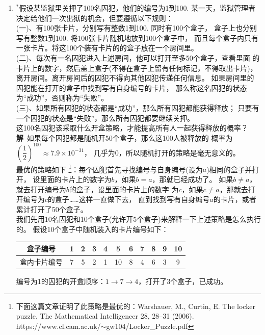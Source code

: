 \begin{enumerate}[label={【\textbf{例\thechapter.\arabic*}】},
 leftmargin=\inteval{\myenumleftmargin}pt,
 itemsep=\inteval{\myenumitempsep}pt,
 itemindent=\inteval{\myenumitemindent}pt]
\item $^*$假设某监狱里关押了100名囚犯，他们的编号为1到100. 
某一天，监狱管理者决定给他们一次出狱的机会，但要遵循以下规则：\\
(一)、有100张卡片，分别写有整数1到100. 同时有100个盒子，
盒子上也分别写有整数1到100. 将100张卡片随机地放到100个盒子中，
而且每个盒子内只有一张卡片。将这100个装有卡片的的盒子放在一个房间里。\\
(二)、每次有一名囚犯进入上述房间，他可以打开至多50个盒子，查看里面
的卡片上的数字，然后盖上盒子(不得在盒子上留有任何标记，不得取出卡片)，
离开房间。离开房间后的囚犯不得向其他囚犯传递任何信息。
如果房间里的囚犯能在打开的盒子中找到写有自身编号的卡片，
那么称这名囚犯的状态为“成功”，否则称为“失败”。\\
(三)、如果所有囚犯的状态都是“成功”，那么所有囚犯都能获得释放；
只要有一个囚犯的状态是“失败”，那么所有囚犯都要继续关押。\\
这100名囚犯该采取什么开盒策略，才能提高所有人一起获得释放的概率？\\
\textbf{解}\ 如果每个囚犯都是随机开50个盒子，那么这100人被释放的
概率为$\left(\dfrac{1}{2}\right)^{100}\approx 7.9\times 10^{-31} $，
几乎为0，所以随机打开的策略是毫无意义的。 \\
最优的策略如下
\footnote{下面这篇文章证明了此策略是最优的：Warshauer, M., Curtin, E. The locker puzzle. The Mathematical Intelligencer 28, 28–31 (2006). https://www.cl.cam.ac.uk/$\sim $gw104/Locker\_Puzzle.pdf }：每个囚犯首先寻找编号与自身编号(设为$a$)相同的盒子并打开，
设里面的卡片上的数字为$b$，如果$b=a$，那就已经成功了。
如果$b\neq a$，就去打开编号为$b$的盒子，设里面的卡片上的数字
为$c$，如果$c\neq a$，那就去打开编号为$c$的盒子……这样一直做下去，
直到找到写有自身编号$a$的卡片，或者累计打开了50个盒子。\\
我们先用10名囚犯和10个盒子(允许开5个盒子)来解释一下上述策略是怎么执行的。
假设10个盒子中随机装入的卡片编号如下：
\begin{table}[H] 
    \centering
    \renewcommand\arraystretch{1}
    \begin{tabular}{|c|c|c|c|c|c|c|c|c|c|c|}
        \hline
        盒子编号  & 1 & 2 & 3 & 4 & 5 & 6 & 7 & 8 & 9 & 10 \\
        \hline
        盒内卡片编号  & 7 & 5 & 2 & 1 & 10 & 8 & 4 & 6 & 3 & 9  \\
        \hline
    \end{tabular}
\end{table}
\vspace{-4mm}
编号为1的囚犯的开盒顺序：$ 1 \to 7 \to 4 $，打开了3个盒子，已成功。

\end{enumerate}
